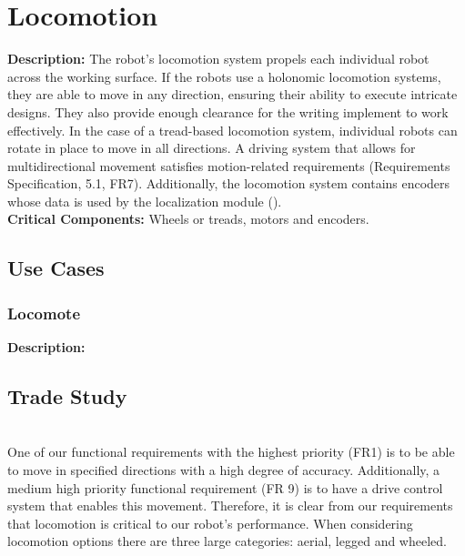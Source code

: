 
\section{Locomotion}
\label{sec:locomotion}
\textbf{Description:} The robot's locomotion system propels each individual robot across the working surface. If the robots use a holonomic locomotion systems, they are able to move in any direction, ensuring their ability to execute intricate designs. They also provide enough clearance for the writing implement to work effectively. In the case of a tread-based locomotion system, individual robots can rotate in place to move in all directions. A driving system that allows for multidirectional movement satisfies motion-related requirements (Requirements Specification, 5.1, FR7). Additionally, the locomotion system contains encoders whose data is used by the localization module (). \\

\noindent
\textbf{Critical Components:} Wheels or treads, motors and encoders.


\subsection{Use Cases}
\subsubsection{Locomote}
\textbf{Description:} 

\subsection{Trade Study}
\label{sec:trade_locomotion}
 \\
One of our functional requirements with the highest priority (FR1) is to be able to move in specified directions with a high degree of accuracy. Additionally, a medium high priority functional requirement (FR 9) is to have a drive control system that enables this movement. Therefore, it is clear from our requirements that locomotion is critical to our robot's performance. When considering locomotion options there are three large categories: aerial, legged and wheeled. 

